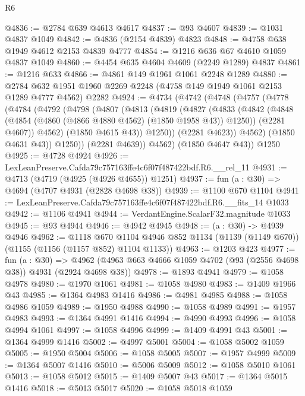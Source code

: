 \begin{lexlean}{R6}
\begin{coremodule}
@4836 := @2784 @639 @4613 @4617
@4837 := @93 @4607
@4839 := @1031 @4837 @1049
@4842 := @4836 (@2154 @4839) @4823
@4848 := @4758 @638 @1949 @4612 @2153 @4839 @4777
@4854 := @1216 @636 @67 @4610 @1059 @4837 @1049
@4860 := @4454 @635 @4604 @4609 (@2249 @1289) @4837
@4861 := @1216 @633
@4866 := @4861 @149 @1961 @1061 @2248 @1289
@4880 := @2784 @632 @1951 @1960 @2269 @2248 (@4758 @149 @1949 @1061 @2153 @1289 @4777 @4562) @2282
@4924 := @4734
    (@4742
      (@4748
        (@4757
          (@4778
            (@4784
              (@4792
                (@4798
                  (@4807
                    (@4813
                      (@4819
                        (@4827
                          (@4833
                            (@4842
                              (@4848 (@4854 (@4860 (@4866 @4880 @4562) (@1850 @1958 @43)) @1250))
                              (@2281 @4607))
                            @4562)
                          (@1850 @4615 @43))
                        @1250))
                    (@2281 @4623))
                  @4562)
                (@1850 @4631 @43))
              @1250))
          (@2281 @4639))
        @4562)
      (@1850 @4647 @43))
    @1250
@4925 := @4728 @4924
@4926 := LexLeanPreserve.Cafda79c757163ffe4c6f07f487422bdf.R6.__rel_11
@4931 := @4713 (@4719 (@4925 (@4926 @4655)) @1251)
@4937 := fun (a : @30) => @4694 (@4707 @4931 (@2828 @4698 @38))
@4939 := @1100 @670 @1104
@4941 := LexLeanPreserve.Cafda79c757163ffe4c6f07f487422bdf.R6.__fits_14 @1033
@4942 := @1106 @4941
@4944 := VerdantEngine.ScalarF32.magnitude @1033
@4945 := @93 @4944
@4946 := @4942 @4945
@4948 := (a : @30) -> @4939 @4946
@4962 := @1118
    @670
    @1104
    @4946
    @852
    @1134
    (@1139 (@1149 @670))
    (@1155 (@1156 (@1157 @852) @1104 @1133))
@4963 := @1203 @423
@4977 := fun (a : @30) =>
  @4962 (@4963 @663 @4666 @1059 @4702 (@93 (@2556 @4698 @38)) @4931 (@2924 @4698 @38))
@4978 := @1893 @4941
@4979 := @1058 @4978
@4980 := @1970 @1061
@4981 := @1058 @4980
@4983 := @1409 @1966 @43
@4985 := @1364 @4983 @1416
@4986 := @4981 @4985
@4988 := @1058 @4986 @1059
@4989 := @1950 @4988
@4990 := @1058 @4989
@4991 := @1957 @4983
@4993 := @1364 @4991 @1416
@4994 := @4990 @4993
@4996 := @1058 @4994 @1061
@4997 := @1058 @4996
@4999 := @1409 @4991 @43
@5001 := @1364 @4999 @1416
@5002 := @4997 @5001
@5004 := @1058 @5002 @1059
@5005 := @1950 @5004
@5006 := @1058 @5005
@5007 := @1957 @4999
@5009 := @1364 @5007 @1416
@5010 := @5006 @5009
@5012 := @1058 @5010 @1061
@5013 := @1058 @5012
@5015 := @1409 @5007 @43
@5017 := @1364 @5015 @1416
@5018 := @5013 @5017
@5020 := @1058 @5018 @1059

\end{coremodule}
\end{lexlean}
